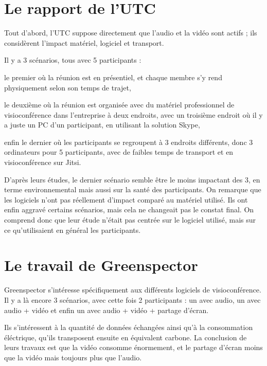 \documentclass[11pt,a4paper]{report}
\begin{document}
\section{Le rapport de l'UTC}
Tout d'abord, l'UTC suppose directement que l'audio et la vidéo sont actifs ; ils considèrent l'impact matériel, logiciel et transport.

Il y a 3 scénarios, tous avec 5 participants : 
\bi \item le premier où la réunion est en présentiel, et chaque membre s'y rend physiquement selon son temps de trajet,
\item le deuxième où la réunion est organisée avec du matériel professionnel de visioconférence dans l'entreprise à deux endroits, avec un troisième endroit où il y a juste un PC d'un participant, en utilisant la solution Skype,
\item enfin le dernier où les participants se regroupent à 3 endroits différents, donc 3 ordinateurs pour 5 participants, avec de faibles temps de transport et en visioconférence sur Jitsi. \ei

D'après leurs études, le dernier scénario semble être le moins impactant des 3, en terme environnemental mais aussi sur la santé des participants. On remarque que les logiciels n'ont pas réellement d'impact comparé au matériel utilisé. Ils ont enfin aggravé certains scénarios, mais cela ne changeait pas le constat final. On comprend donc que leur étude n'était pas centrée sur le logiciel utilisé, mais sur ce qu'utilisaient en général les participants.

\section{Le travail de Greenspector}
Greenspector s'intéresse spécifiquement aux différents logiciels de visioconférence. Il y a là encore 3 scénarios, avec cette fois 2 participants : un avec audio, un avec audio + vidéo et enfin un avec audio + vidéo + partage d'écran.

Ils s'intéressent à la quantité de données échangées ainsi qu'à la consommation éléctrique, qu'ils transposent ensuite en équivalent carbone. La conclusion de leurs travaux est que la vidéo consomme énormement, et le partage d'écran moins que la vidéo mais toujours plus que l'audio.
\end{document}

